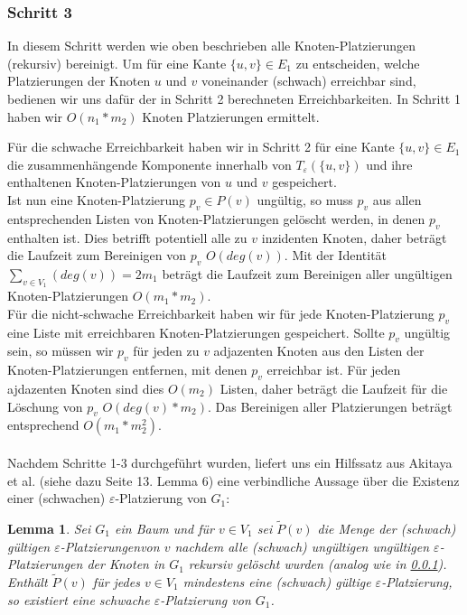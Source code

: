 \documentclass[a4paper, 12pt, twoside]{article}
\theoremstyle{Format1} %
\newtheorem{Lem}[Def]{Lemma}                %
\begin{document}
\subsubsection{Schritt 3} \label{Schritt 3}
In diesem Schritt werden wie oben beschrieben alle Knoten-Platzierungen (rekursiv) bereinigt.
Um für eine Kante $\{u,v\} \in E_1$ zu entscheiden, welche Platzierungen der Knoten $u$ und $v$ voneinander (schwach) erreichbar sind, bedienen wir uns dafür der in
Schritt 2 berechneten Erreichbarkeiten. In Schritt 1 haben wir $O(n_1*m_2)$ Knoten Platzierungen ermittelt.

Für die schwache Erreichbarkeit haben wir in Schritt 2 für eine Kante $\{u,v\} \in E_1$ die zusammenhängende Komponente innerhalb von $T_{\varepsilon}(\{u,v\})$
und ihre enthaltenen Knoten-Platzierungen von $u$ und $v$ gespeichert.
\\
Ist nun eine Knoten-Platzierung $p_v \in P(v)$ ungültig, so muss $p_v$ aus allen entsprechenden Listen von Knoten-Platzierungen gelöscht werden, in
denen $p_v$ enthalten ist. Dies betrifft potentiell alle zu $v$ inzidenten Knoten, daher beträgt die Laufzeit zum Bereinigen von $p_v$ $O(deg(v))$.
Mit der Identität $\sum_{v \in V_1}(deg(v)) = 2m_1$ beträgt die Laufzeit zum Bereinigen aller ungültigen Knoten-Platzierungen $O(m_1*m_2)$.
\\
Für die nicht-schwache Erreichbarkeit haben wir für jede Knoten-Platzierung $p_v$ eine Liste mit erreichbaren Knoten-Platzierungen gespeichert.
Sollte $p_v$ ungültig sein, so müssen wir $p_v$ für jeden zu $v$ adjazenten Knoten aus den Listen der Knoten-Platzierungen entfernen, mit denen $p_v$ erreichbar ist.
Für jeden ajdazenten Knoten sind dies $O(m_2)$ Listen, daher beträgt die Laufzeit für die Löschung von $p_v$ $O(deg(v)*m_2)$.
Das Bereinigen aller Platzierungen beträgt entsprechend $O(m_1*m_2^2)$.
\\
\\
Nachdem Schritte 1-3 durchgeführt wurden, liefert uns ein Hilfssatz aus Akitaya et al. (siehe dazu Seite 13. Lemma 6) eine verbindliche Aussage über die Existenz
einer (schwachen) $\varepsilon$-Platzierung von $G_1$:

\begin{Lem} \label {Lemma 1}
	Sei $G_1$ ein Baum und für $v \in V_1$ sei $\tilde{P}(v)$ die Menge der (schwach) gültigen $\varepsilon$-Platzierungenvon $v$ nachdem
	alle (schwach) ungültigen ungültigen $\varepsilon$-Platzierungen der Knoten in $G_1$ rekursiv gelöscht wurden (analog wie in \ref{Schritt 3}).
	Enthält $\tilde{P}(v)$ für jedes $v \in V_1$ mindestens eine (schwach) gültige $\varepsilon$-Platzierung, so existiert
	eine schwache $\varepsilon$-Platzierung von $G_1$.
\end{Lem}
\end{document}

